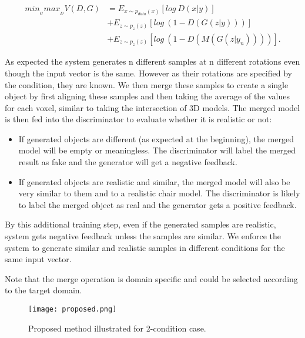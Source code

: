 \documentclass[runningheads]{llncs}
\begin{document}
\begin{equation}
\begin{split}
min_{_{G}}max_{_{D}}V(D,G) &= E_{x\sim p_{data}(x)}[log~D(x|y)] \\
&+  E_{z\sim p_{z}(z)}[log~ (1-D(G(z|y)))] \\
&+  E_{z\sim p_{z}(z)}[log~ (1-D(M(G(z|y_{n}))))].
\end{split}
\end{equation}

As expected the system generates n different samples at n different rotations even though the input vector is the same.  However as their rotations are specified by the condition, they are known. We then merge these samples to create a single object by first aligning these samples and then taking the average of the values for each voxel, similar to taking the intersection of 3D models. The merged model is then fed into the discriminator to evaluate whether it is realistic or not:

\begin{itemize}
\item If generated objects are different (as expected at the beginning), the merged model will be empty or meaningless. The discriminator will label the merged result as fake and the generator will get a negative feedback.
\item If generated objects are realistic and similar, the merged model will also be very similar to them and to a realistic chair model. The discriminator is likely to label the merged object as real and the generator gets a positive feedback.
\end{itemize}



By this additional training step, even if the generated samples are realistic, system gets negative feedback unless the samples are similar. We enforce the system to generate similar and realistic samples in different conditions for the same input vector. 

Note that the merge operation is domain specific and could be selected according to the target domain.

\begin{figure}
\centering
\texttt{[image: proposed.png]}
\caption{Proposed method illustrated for 2-condition case.} \label{fig2}
\end{figure}
\end{document}

